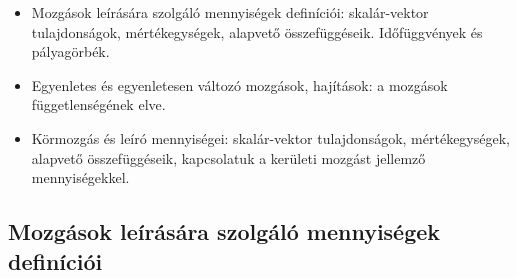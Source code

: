\documentclass[../fizika.tex]{subfiles}
\begin{document}
    \begin{itemize}
        \item Mozgások leírására szolgáló mennyiségek definíciói: skalár-vektor tulajdonságok, mértékegységek, alapvető összefüggéseik. Időfüggvények és pályagörbék.
        \item Egyenletes és egyenletesen változó mozgások, hajítások: a mozgások függetlenségének elve.
        \item Körmozgás és leíró mennyiségei: skalár-vektor tulajdonságok, mértékegységek, alapvető összefüggéseik, kapcsolatuk a kerületi mozgást jellemző mennyiségekkel.
    \end{itemize}

    \subsection{Mozgások leírására szolgáló mennyiségek definíciói}

         
\end{document}
